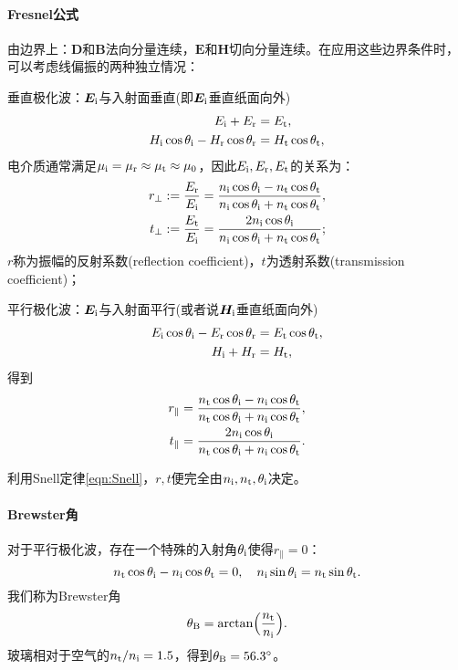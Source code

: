 \paragraph{Fresnel公式}
由边界上：$\bm D$和$\bm B$法向分量连续，$\bm E$和$\bm H$切向分量连续。在应用这些边界条件时，可以考虑线偏振的两种独立情况：
\begin{compactenum}
	\item 垂直极化波：$\bm E_{\mathrm{i}}$与入射面垂直(即$\bm E_{\mathrm{i}}$垂直纸面向外)%
	\begin{align*}
        E_{\mathrm{i}}+E_\text r&=E_\text t,\\
        H_{\mathrm{i}}\cos\theta_{\mathrm{i}}-H_\text r\cos\theta_\text r&=H_\text t\cos\theta_\text t,
    \end{align*}
    电介质通常满足$\mu_{\mathrm{i}}=\mu_\text r\approx\mu_\text t\approx\mu_0$，因此$E_{\mathrm{i}},E_\text r,E_\text t$的关系为：
    \begin{align}
        \label{eqn:Fresnel rperp}
        r_\perp:=\frac{E_\text r}{E_{\mathrm{i}}}=\frac{n_{\mathrm{i}}\cos\theta_{\mathrm{i}}-n_\text t\cos\theta_\text t}{n_{\mathrm{i}}\cos\theta_{\mathrm{i}}+n_\text t\cos\theta_\text t},\\
        \label{eqn:Fresnel tperp}
        t_\perp:=\frac{E_\text t}{E_{\mathrm{i}}}=\frac{2n_{\mathrm{i}}\cos\theta_{\mathrm{i}}}{n_{\mathrm{i}}\cos\theta_{\mathrm{i}}+n_\text t\cos\theta_\text t};
    \end{align}
    $r$称为振幅的反射系数(reflection coefficient)，$t$为透射系数(transmission coefficient)；
	\item 平行极化波：$\bm E_{\mathrm{i}}$与入射面平行(或者说$\bm H_{\mathrm{i}}$垂直纸面向外)
	\begin{align*}
        E_{\mathrm{i}}\cos\theta_{\mathrm{i}}-E_\text r\cos\theta_\text r&=E_\text t\cos\theta_\text t,\\
        H_{\mathrm{i}}+H_\text r&=H_\text t,
    \end{align*}
    得到 
    \begin{align}
        \label{eqn:Fresnel rpara}
        r_\parallel&=\frac{n_\text t\cos\theta_{\mathrm{i}}-n_{\mathrm{i}}\cos\theta_\text t}{n_\text t\cos\theta_{\mathrm{i}}+n_{\mathrm{i}}\cos\theta_\text t},\\
        \label{eqn:Fresnel tpara}
        t_\parallel&=\frac{2n_{\mathrm{i}}\cos\theta_{\mathrm{i}}}{n_\text t\cos\theta_{\mathrm{i}}+n_{\mathrm{i}}\cos\theta_\text t}.
    \end{align}
\end{compactenum}
利用Snell定律\eqref{eqn:Snell}，$r,t$便完全由$n_{\mathrm{i}},n_\text t,\theta_{\mathrm{i}}$决定。
\paragraph{Brewster角}
对于平行极化波，存在一个特殊的入射角$\theta_{\mathrm{i}}$使得$r_\parallel=0$：%
\[
    n_\text t\cos\theta_{\mathrm{i}}-n_{\mathrm{i}}\cos\theta_\text t=0,\quad n_{\mathrm{i}}\sin\theta_{\mathrm{i}}=n_\text t\sin\theta_\text t.
\]
我们称为Brewster角
\begin{equation}
    \label{eqn:Brewster}
    \theta_\text B=\arctan\Bigl(\frac{n_\text t}{n_{\mathrm{i}}}\Bigr).
\end{equation}
玻璃相对于空气的$n_\text t/n_{\mathrm{i}}=1.5$，得到$\theta_\text B=56.3^\circ$。
